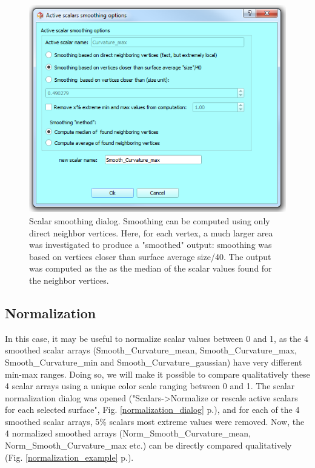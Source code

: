 \documentclass[12pt, a4paper]{book}
\begin{document}
\begin{figure}
  \centering
  \includegraphics[scale=0.5]{scalar_smoothing_dialog.png} 
	\caption{ 
Scalar smoothing dialog. Smoothing can be computed using only direct neighbor vertices. Here, for each vertex, a much larger area was investigated to produce a "smoothed" output: smoothing was based on vertices closer than surface average size/40. The output was computed as the as the median of the scalar values found for the neighbor vertices.
	}
\label{smoothing_scalars_dialog}
\end{figure}

\subsection{Normalization}
In this case, it may be useful to normalize scalar values between 0 and 1, as the 4 smoothed scalar arrays (Smooth\_Curvature\_mean, Smooth\_Curvature\_max, Smooth\_Curvature\_min and Smooth\_Curvature\_gaussian) have very different min-max ranges. Doing so, we will make it possible to compare qualitatively these 4 scalar arrays using a unique color scale ranging between 0 and 1. The scalar normalization dialog was opened ("Scalars->Normalize or rescale active scalars for each selected surface", Fig. \ref{normalization_dialog} p.\pageref{normalization_dialog}), and for each of the 4 smoothed scalar arrays, 5\% scalars most extreme values were removed. Now, the 4 normalized smoothed arrays (Norm\_Smooth\_Curvature\_mean, Norm\_Smooth\_Curvature\_max etc.) can be directly compared qualitatively (Fig. \ref{normalization_example} p.\pageref{normalization_example}).
\end{document}
